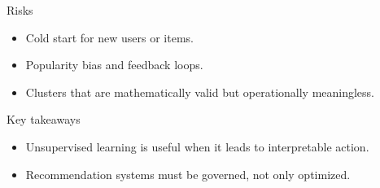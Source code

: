 \documentclass[aspectratio=169,11pt]{beamer}
\begin{document}
\begin{frame}{Risks}
  \begin{itemize}
    \item Cold start for new users or items.
    \item Popularity bias and feedback loops.
    \item Clusters that are mathematically valid but operationally meaningless.
  \end{itemize}
\end{frame}


\begin{frame}{Key takeaways}
  \begin{itemize}
    \item Unsupervised learning is useful when it leads to interpretable action.
    \item Recommendation systems must be governed, not only optimized.
  \end{itemize}
\end{frame}
\end{document}
